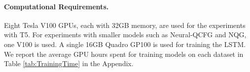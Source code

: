 \paragraph{Computational Requirements.}
\label{sec:method:compreq}
\label{sec:comp-requirements}
Eight Tesla V100 GPUs, each with 32GB memory, are used for the experiments with T5. 
For experiments with smaller models such as Neural-QCFG and NQG, one V100 is used. A single 16GB Quadro GP100 is used for training the LSTM.
%
%
We report the average GPU hours spent for training models on each dataset in Table \ref{tab:TrainingTime} in the Appendix.